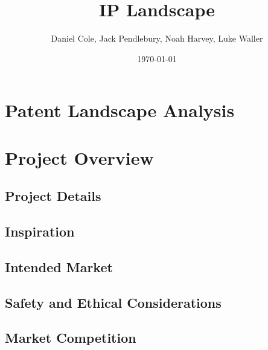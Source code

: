 \documentclass [12pt]{article}
\begin{document}
\title{\bf IP Landscape}
\author{Daniel Cole, Jack Pendlebury, Noah Harvey, Luke Waller}
\date{\today}
\maketitle
\thispagestyle{empty}

\newpage
{}
\setcounter{page}{1}
\tableofcontents
\newpage

\listoffigures
\listoftables



\newpage
\section{Patent Landscape Analysis}\label{sec:PLA}

\section{Project Overview}\label{sec:project_overview}
\subsection{Project Details}\label{sec:project_details}
\subsection{Inspiration}\label{sec:inspiration}
\subsection{Intended Market}\label{sec:intended_market}
\subsection{Safety and Ethical Considerations}\label{sec:SAEC}
\subsection{Market Competition}\label{sec:market_competition}
\end{document}
